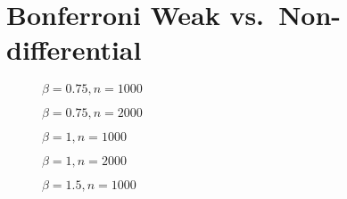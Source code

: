 \section{Bonferroni Weak vs.\ Non-differential}

%  
%
%  
%  
%
%  
%  
%
%  
\begin{figure}
  \centering
  
  \caption{$\beta = 0.75, n = 1000$}
\end{figure}

\begin{figure}
  \centering
  
  \caption{$\beta = 0.75, n = 2000$}
\end{figure}
\begin{figure}
  \centering
  
  \caption{$\beta = 1, n = 1000$}
\end{figure}

\begin{figure}
  \centering
  
  \caption{$\beta = 1, n = 2000$}
\end{figure}
\begin{figure}
  \centering
  
  \caption{$\beta = 1.5, n = 1000$}
\end{figure}

